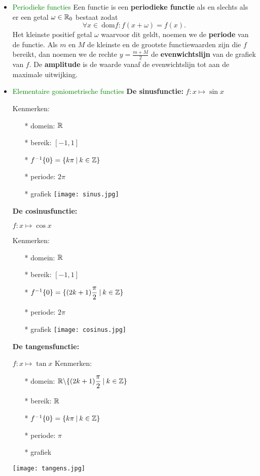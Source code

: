 \begin{itemize}
\item \textcolor{green}{\hypertarget{periodieke_functies}{Periodieke functies}}\label{periodieke_functies}\newline
Een functie is een {\bf periodieke functie} als en slechts als er een getal $\omega \in \mathbb{R}_0$ bestaat zodat \[\forall x \in \:\mbox{dom}f : f(x+\omega)=f(x).\]
Het kleinste positief getal $\omega$ waarvoor dit geldt, noemen we de {\bf periode} van de functie. Als $m$ en $M$ de kleinste en de grootste functiewaarden zijn die $f$ bereikt, dan noemen we de rechte $y=\frac{m+M}{2}$ de {\bf evenwichtslijn} van de grafiek van $f$. De {\bf amplitude} is de waarde vanaf de evenwichtslijn tot aan de maximale uitwijking.
\item \textcolor{green}{Elementaire goniometrische functies}\newline\newline
\hypertarget{sinusfunctie}{{\bf De sinusfunctie: }}\label{sinusfunctie}$f :x\mapsto\sin x$\vskip 0.5cm

Kenmerken: \begin{itemize}
		\item[*] domein: $\mathbb{R}$
		\item[*] bereik: $[-1, 1]$
		\item[*] $f^{-1}\{0\}=\{k\pi\:|\:k\in\mathbb{Z}\}$
		\item[*] periode: $2\pi$
		\item[*] grafiek %
                         \texttt{[image: sinus.jpg]}
		\end{itemize}
\hypertarget{cosinusfunctie}{{\bf De cosinusfunctie: }}\label{cosinusfunctie}$f :x\mapsto\cos x$\vskip 0.5cm

Kenmerken: \begin{itemize}
		\item[*] domein: $\mathbb{R}$
		\item[*] bereik: $[-1, 1]$
		\item[*] $f^{-1}\{0\}=\{(2k+1)\displaystyle\frac{\displaystyle \pi}{\displaystyle 2}\:|\:k\in\mathbb{Z}\}$
		\item[*] periode: $2\pi$
		\item[*] grafiek %
                         \texttt{[image: cosinus.jpg]}
		\end{itemize}
\hypertarget{tangensfunctie}{{\bf De tangensfunctie: }}\label{tangensfunctie}$f :x\mapsto\tan{x}$\vskip 		0.5cm
Kenmerken:\begin{itemize}
		\item[*] domein: $\mathbb{R} \backslash \{(2k+1)\displaystyle\frac{\displaystyle \pi}{\displaystyle 2}\:|\:k\in\mathbb{Z}\}$
		\item[*] bereik: $\mathbb{R}$
		\item[*] $f^{-1}\{0\}=\{k\pi\:|\:k\in\mathbb{Z}\}$
		\item[*] periode: $\pi$
		\item[*] grafiek 
		\end{itemize}
                \texttt{[image: tangens.jpg]}


\end{itemize}
